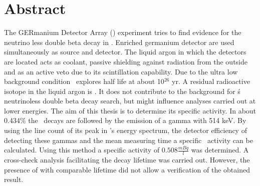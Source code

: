 \documentclass[encoding=utf8,british]{tumphthesis}
\begin{document}



\chapter*{Abstract}
The GERmanium Detector Array (\gerda) experiment tries to find evidence for the neutrino less double beta decay in .
Enriched germanium detector are used simultaneously as source and detector.
The liquid argon in which the detectors are located acts as coolant, passive shielding against radiation from the outside and as an active veto due to its scintillation capability.
Due to the ultra low background condition \gerda\ explores half life at about 10$^{26}$ yr.
A residual radioactive isotope in the liquid argon is .
It does not contribute to the background for \gerda\'s neutrinoless double beta decay search, but might influence analyses carried out at lower energies.
The aim of this thesis is to determine its specific activity.
In about 0.434$\%$ the \Kr\ decays are followed by the emission of a gamma with 514 keV.
By using the line count of its peak in \gerda's energy spectrum, the detector efficiency of detecting these gammas and the mean measuring time a specific \Kr\ activity can be calculated.
Using this method a specific activity of $0.508\frac{\unit{mBq}}{\unit{l}}$ was determined.
A cross-check analysis facilitating the decay lifetime was carried out.
However, the presence of  with comparable lifetime did not allow a verification of the obtained result.
\end{document}

